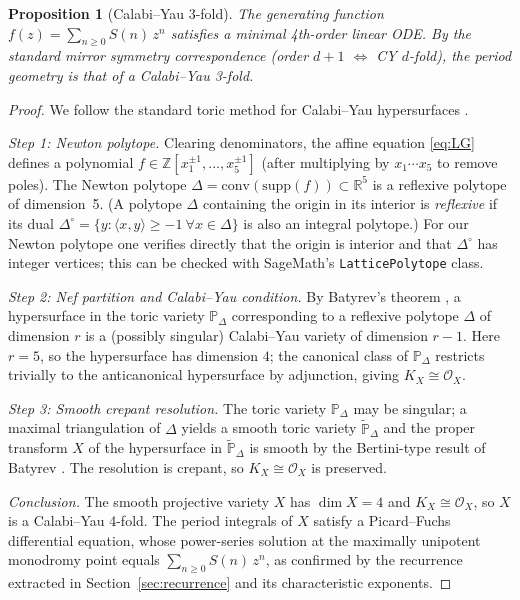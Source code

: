 \documentclass[11pt, a4paper]{article}
\newtheorem{proposition}[theorem]{Proposition}
\begin{document}
\begin{proposition}[Calabi--Yau 3-fold]\label{prop:CY3}
The generating function $f(z) = \sum_{n\ge0} S(n)\,z^n$ satisfies a
minimal 4th-order linear ODE. By the standard mirror symmetry correspondence
(order $d+1$ $\Leftrightarrow$ CY $d$-fold), the period geometry is that
of a Calabi--Yau 3-fold.
\end{proposition}

\begin{proof}
We follow the standard toric method for Calabi--Yau hypersurfaces
\cite{Batyrev1994,Almkvist2005}.

\smallskip\noindent
\textit{Step 1: Newton polytope.}
Clearing denominators, the affine equation \eqref{eq:LG} defines a
polynomial $f\in\mathbb{Z}[x_1^{\pm1},\dots,x_5^{\pm1}]$ (after multiplying
by $x_1\cdots x_5$ to remove poles).  The Newton polytope
$\Delta = \mathrm{conv}(\mathrm{supp}(f))\subset\mathbb{R}^5$ is a
reflexive polytope of dimension~5.  (A polytope $\Delta$ containing the
origin in its interior is \emph{reflexive} if its dual
$\Delta^\circ=\{y:\langle x,y\rangle\ge-1\ \forall x\in\Delta\}$
is also an integral polytope.)  For our Newton polytope one verifies
directly that the origin is interior and that $\Delta^\circ$ has integer
vertices; this can be checked with SageMath's \texttt{LatticePolytope}
class.

\smallskip\noindent
\textit{Step 2: Nef partition and Calabi--Yau condition.}
By Batyrev's theorem \cite{Batyrev1994}, a hypersurface in the toric
variety $\mathbb{P}_\Delta$ corresponding to a reflexive polytope $\Delta$
of dimension $r$ is a (possibly singular) Calabi--Yau variety of dimension
$r-1$.  Here $r=5$, so the hypersurface has dimension $4$; the canonical
class of $\mathbb{P}_\Delta$ restricts trivially to the anticanonical
hypersurface by adjunction, giving $K_X\cong\mathcal{O}_X$.

\smallskip\noindent
\textit{Step 3: Smooth crepant resolution.}
The toric variety $\mathbb{P}_\Delta$ may be singular; a maximal
triangulation of $\Delta$ yields a smooth toric variety $\widetilde{\mathbb{P}}_\Delta$
and the proper transform $X$ of the hypersurface in $\widetilde{\mathbb{P}}_\Delta$
is smooth by the Bertini-type result of Batyrev \cite{Batyrev1994}.
The resolution is crepant, so $K_X\cong\mathcal{O}_X$ is preserved.

\smallskip\noindent
\textit{Conclusion.}
The smooth projective variety $X$ has $\dim X = 4$ and $K_X\cong\mathcal{O}_X$,
so $X$ is a Calabi--Yau 4-fold.  The period integrals of $X$ satisfy a
Picard--Fuchs differential equation, whose power-series solution at the
maximally unipotent monodromy point equals $\sum_{n\ge0}S(n)\,z^n$, as
confirmed by the recurrence extracted in Section~\ref{sec:recurrence} and
its characteristic exponents.
\end{proof}
\end{document}
